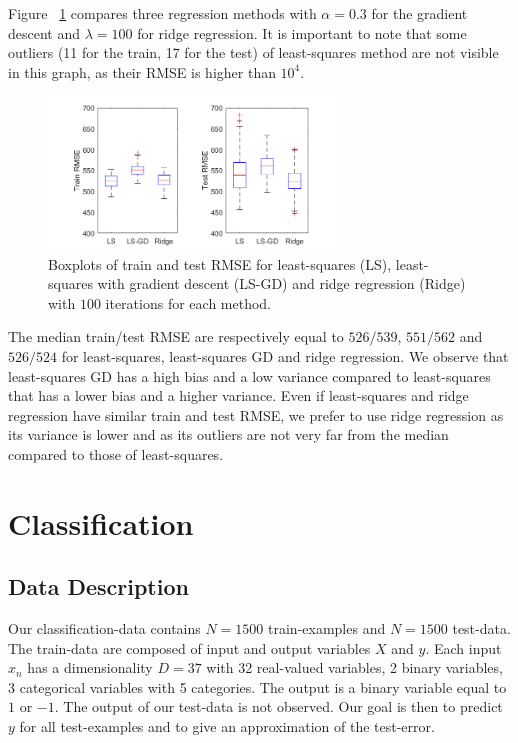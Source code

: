 \documentclass{article} %
\begin{document}
Figure ~\ref{fig:reg_compareMethods} compares three regression methods with $\alpha = 0.3$ for the gradient descent and $\lambda = 100$ for ridge regression. It is important to note that some outliers (11 for the train, 17 for the test) of least-squares method are not visible in this graph, as their RMSE is higher than $10^4$.

\begin{figure}[!h] %
	\center
	\includegraphics[width=3in]{figures/comparisonReg.png}
	\caption{Boxplots of train and test RMSE for least-squares (LS), least-squares with gradient descent (LS-GD) and ridge regression (Ridge) with $100$ iterations for each method.}
	\label{fig:reg_compareMethods}
\end{figure}

The median train/test RMSE are respectively equal to $526/539$, $551/562$ and $526/524$ for least-squares, least-squares GD and ridge regression. We observe that least-squares GD has a high bias and a low variance compared to least-squares that has a lower bias and a higher variance. Even if least-squares and ridge regression have similar train and test RMSE, we prefer to use ridge regression as its variance is lower and as its outliers are not very far from the median compared to those of least-squares.

\section{Classification}
\subsection{Data Description}
Our classification-data contains $N=1500$ train-examples and $N=1500$ test-data. The train-data are composed of input and output variables $X$ and $y$. Each input $x_n$ has a dimensionality $D=37$ with 32 real-valued variables, 2 binary variables, 3 categorical variables with 5 categories. The output is a binary variable equal to $1$ or $-1$. The output of our test-data is not observed. Our goal is then to predict $y$ for all test-examples and to give an approximation of the test-error.
\end{document}
